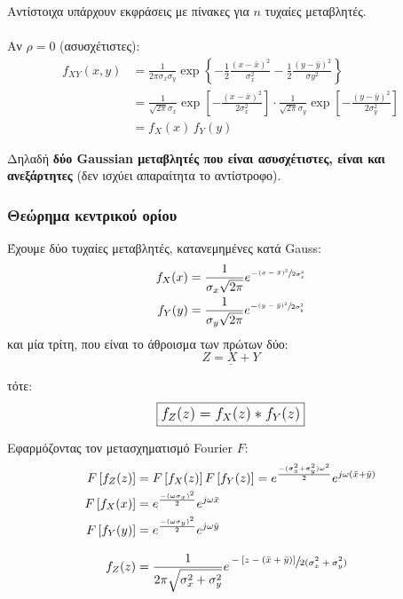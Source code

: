 \documentclass[11pt,a4paper,notitlepage,fleqn,final]{article}
\begin{document}
Αντίστοιχα υπάρχουν εκφράσεις με πίνακες για \( n \) τυχαίες μεταβλητές.

\paragraph{}Αν \( \rho = 0 \) (ασυσχέτιστες):
\begin{align*}
f_{XY}(x,y) &= \frac{1}{2\pi \sigma_x\sigma_y}\exp \left\lbrace
-\frac{1}{2}\frac{(x-\bar x)^2}{\sigma_x^2}
-\frac{1}{2}\frac{(y-\bar y)^2}{\sigma y^2}
 \right\rbrace \\ &=
 \frac{1}{\sqrt{2\pi} \sigma_x}\exp\left[
 -\frac{(x-\bar x)^2}{2\sigma_x^2}\right]
 \cdot\frac{1}{\sqrt{2\pi}\sigma_y}\exp\left[
 -\frac{(y-\bar y)^2}{2\sigma_y^2}\right]
 \\ &= f_X(x) \, f_Y(y)
\end{align*}

Δηλαδή \textbf{δύο Gaussian μεταβλητές που είναι ασυσχέτιστες, είναι και
	ανεξάρτητες} (δεν ισχύει απαραίτητα το αντίστροφο).

\subsubsection{Θεώρημα κεντρικού ορίου}
Έχουμε δύο τυχαίες μεταβλητές, κατανεμημένες κατά Gauss:
\begin{align*}
	f_X(x) &= \frac{1}{\sigma_x \sqrt{2\pi}}
	e^{-\sfrac{(x-\bar x)^2}{2\sigma_x^2} } \\
	f_Y(y) &= \frac{1}{\sigma_y\sqrt{2\pi}}
	e^{-\sfrac{(y-\bar y)^2}{2\sigma_y^2} }
\end{align*}
και μία τρίτη, που είναι το άθροισμα των πρώτων δύο:
\[
\underline{Z=X+Y}
\]

τότε:
\[
\boxed{
\mathlarger{f_Z(z) = f_X(z) * f_Y(z)}
}
\]

Εφαρμόζοντας τον μετασχηματισμό Fourier \( F \):
\begin{align*}
	F\left[f_Z(z)\right] &= F\left[f_X(z)\right]
	F\left[f_Y(z)\right] =
	e^{\frac{-(\sigma_x^2+\sigma_y^2)\omega^2}{2}}
	e^{j\omega (\bar x+\bar y)}
	\\
	F\left[f_X(x)\right] &= e^{\frac{-(\omega\sigma_x)^2}{2}}
	e^{j\omega \bar x}
	\\
	F\left[f_Y(y)\right] &= e^{\frac{-(\omega \sigma_y)^2}{2}}
	e^{j\omega \bar y}
	\\[2ex]
	f_Z(z) &= \frac{1}{2\pi\sqrt{\sigma_x^2+\sigma_y^2}}
	e^{\displaystyle \sfrac{
		-\left[z-(\bar x+\bar y)\right]
	}{2(\sigma_x^2+\sigma_y^2)}
		}
\end{align*}
\end{document}
